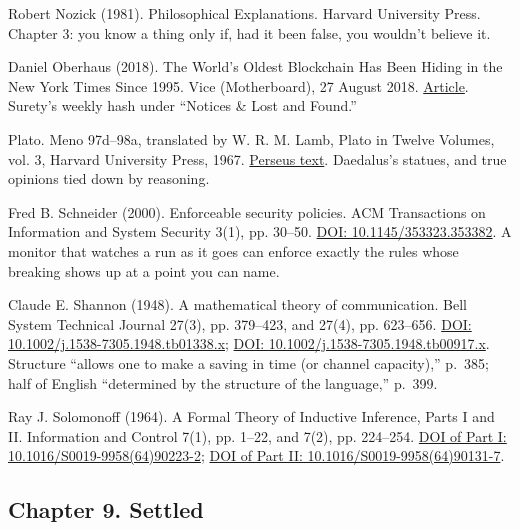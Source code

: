 \noindent Robert Nozick (1981). Philosophical Explanations. Harvard University Press. Chapter 3: you know a thing only if, had it been false, you wouldn't believe it.
\par\medskip

\noindent Daniel Oberhaus (2018). The World's Oldest Blockchain Has Been Hiding in the New York Times Since 1995. Vice (Motherboard), 27 August 2018. \href{https://www.vice.com/en/article/what-was-the-first-blockchain/}{Article}. Surety's weekly hash under ``Notices \& Lost and Found.''
\par\medskip

\noindent Plato. Meno 97d--98a, translated by W. R. M. Lamb, Plato in Twelve Volumes, vol. 3, Harvard University Press, 1967. \href{http://www.perseus.tufts.edu/hopper/text?doc=Plat.+Meno+97d}{Perseus text}. Daedalus's statues, and true opinions tied down by reasoning.
\par\medskip

\noindent Fred B. Schneider (2000). Enforceable security policies. ACM Transactions on Information and System Security 3(1), pp. 30--50. \href{https://doi.org/10.1145/353323.353382}{DOI: 10.1145/353323.353382}. A monitor that watches a run as it goes can enforce exactly the rules whose breaking shows up at a point you can name.
\par\medskip

\noindent Claude E. Shannon (1948). A mathematical theory of communication. Bell System Technical Journal 27(3), pp. 379--423, and 27(4), pp. 623--656. \href{https://doi.org/10.1002/j.1538-7305.1948.tb01338.x}{DOI: 10.1002/j.1538-7305.1948.tb01338.x}; \href{https://doi.org/10.1002/j.1538-7305.1948.tb00917.x}{DOI: 10.1002/j.1538-7305.1948.tb00917.x}. Structure ``allows one to make a saving in time (or channel capacity),'' p.~385; half of English ``determined by the structure of the language,'' p.~399.
\par\medskip

\noindent Ray J. Solomonoff (1964). A Formal Theory of Inductive Inference, Parts I and II. Information and Control 7(1), pp. 1--22, and 7(2), pp. 224--254. \href{https://doi.org/10.1016/S0019-9958(64)90223-2}{DOI of Part I: 10.1016/S0019-9958(64)90223-2}; \href{https://doi.org/10.1016/S0019-9958(64)90131-7}{DOI of Part II: 10.1016/S0019-9958(64)90131-7}.
\par\medskip

\subsection*{Chapter 9. Settled}

